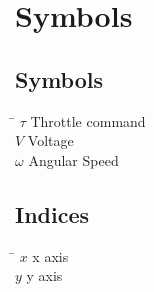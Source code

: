 \chapter*{Symbols}
\label{sec:symbols}

\section*{Symbols}

\begin{tabbing}
 \hspace*{1.6cm} \= \kill
  $\tau$                \> Throttle command\\[0.5ex] 					
  $V$                   \> Voltage \\[0.5ex]										
  $\omega$              \> Angular Speed \\[0.5ex]   		
\end{tabbing}

\section*{Indices}
\begin{tabbing}
 \hspace*{1.6cm}  \= \kill
 $x$ \> x axis \\[0.5ex]
 $y$ \> y axis \\[0.5ex]
\end{tabbing}

